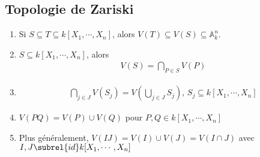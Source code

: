         \subsection{Topologie de Zariski}
            \begin{prop}
                \begin{enumerate}
                    \item Si $S \subseteq T \subseteq k[X_1, \cdots, X_n]$, alors $V(T) \subseteq V(S) \subseteq \mathbb{A}_k^n$.
                    \item $S \subseteq k[X_1, \cdots, X_n]$, alors
                    \begin{align*}
                        V(S) = \bigcap_{P \in S} V(P)
                    \end{align*}
                    \item
                    \begin{align*}
                        \bigcap_{j \in J} V(S_j) = V\left(\bigcup_{j \in J} S_j\right),\, S_j \subseteq k[X_1, \cdots, X_n]
                    \end{align*}
                    \item $V(PQ) = V(P) \cup V(Q)$ pour $P,Q \in k[X_1, \cdots, X_n]$
                    \item Plus généralement, $V(IJ) = V(I) \cup V(J) = V(I \cap J)$ avec $I,J \subrel{id} k[X_1, \cdots, X_n]$
                \end{enumerate}
            \end{prop}
